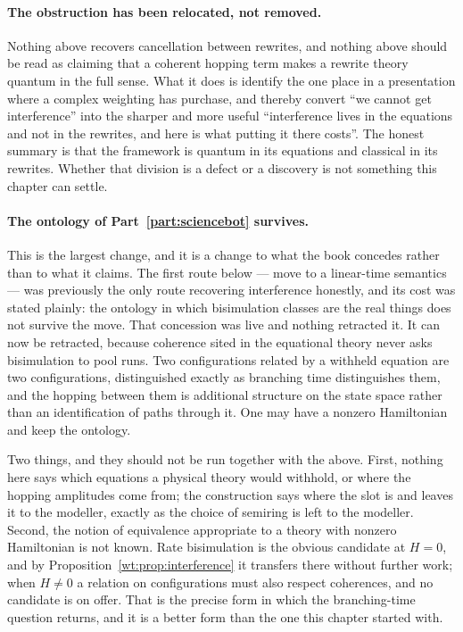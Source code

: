 \paragraph{The obstruction has been relocated, not removed.}
Nothing above recovers cancellation between rewrites, and nothing above
should be read as claiming that a coherent hopping term makes a rewrite
theory quantum in the full sense.  What it does is identify the one place
in a presentation where a complex weighting has purchase, and thereby
convert ``we cannot get interference'' into the sharper and more useful
``interference lives in the equations and not in the rewrites, and here is
what putting it there costs''.  The honest summary is that the framework
is quantum in its equations and classical in its rewrites.  Whether that
division is a defect or a discovery is not something this chapter can
settle.

\paragraph{The ontology of Part~\ref{part:sciencebot} survives.}
This is the largest change, and it is a change to what the book concedes
rather than to what it claims.  The first route below --- move to a
linear-time semantics --- was previously the only route recovering
interference honestly, and its cost was stated plainly: the ontology in
which bisimulation classes are the real things does not survive the move.
That concession was live and nothing retracted it.  It can now be
retracted, because coherence sited in the equational theory never asks
bisimulation to pool runs.  Two configurations related by a withheld
equation are two configurations, distinguished exactly as branching time
distinguishes them, and the hopping between them is additional structure
on the state space rather than an identification of paths through it.  One
may have a nonzero Hamiltonian and keep the ontology.

\begin{remark}
\label{rmk:coherence-gaps}
Two things, and they should not be run together with the above.  First,
nothing here says which equations a physical theory would withhold, or
where the hopping amplitudes come from; the construction says where the
slot is and leaves it to the modeller, exactly as the choice of semiring
is left to the modeller.  Second, the notion of equivalence appropriate to
a theory with nonzero Hamiltonian is not known.  Rate bisimulation is the
obvious candidate at $H = 0$, and by
Proposition~\ref{wt:prop:interference} it transfers there without further
work; when $H \neq 0$ a relation on configurations must also respect
coherences, and no candidate is on offer.  That is the precise form in
which the branching-time question returns, and it is a better form than
the one this chapter started with.
\end{remark}

